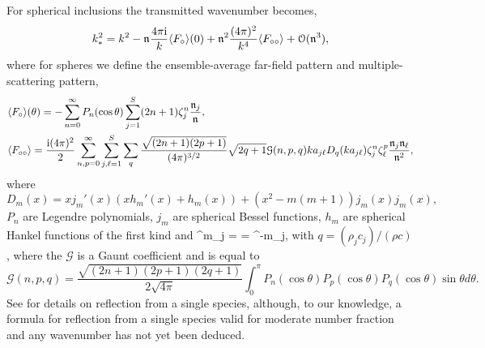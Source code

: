 \documentclass[12pt, a4paper]{article}
\begin{document}
For spherical inclusions the transmitted wavenumber becomes,
\begin{align}
   k_*^2 = k^2 -\mathfrak n_{} \frac{4 \pi \textrm{i}}{k}  \langle F_\circ \rangle(0) + \mathfrak n_{}^2 \frac{(4 \pi)^2 }{k^4} \langle F_{\circ\circ} \rangle
   + \mathcal O(\mathfrak n_{}^3),
  \label{eqn:SmallNfracSpheres}
\end{align}
where for spheres we define the ensemble-average far-field pattern and multiple-scattering pattern,
\begin{align}
  &\langle F_\circ \rangle(\theta) = - \sum_{n=0}^\infty P_n (\cos \theta ) \sum_{j=1}^S (2n+1)  \zeta^n_j \frac{\mathfrak n_{j}}{\mathfrak n_{}},
\\
  &\langle F_{\circ\circ} \rangle = \frac{\textrm{i} (4 \pi)^2}{2} \sum_{n,p=0}^\infty \sum_{j,\ell=1}^S \sum_q  \frac{\sqrt{(2n+1)(2p+1)}}{(4 \pi)^{3/2}}  \sqrt{2 q +1} \mathcal G(n,p,q) k a_{j\ell} D_q(k a_{j\ell}) \zeta^n_j \zeta^p_\ell \frac{\mathfrak n_{j} \mathfrak n_{\ell}}{\mathfrak n_{}^2},
\notag
\end{align}
where
\[
D_m(x) = x j_m'(x)( x h_m'(x) + h_m(x)) + (x^2 - m(m+1))j_m(x) j_m(x),
\]
$P_n$ are   Legendre polynomials, $j_m$ are   spherical Bessel functions, $h_m$ are spherical Hankel functions of the first kind  and
\be
\scatZs^m_j =  = \scatZs^{-m}_j,
\label{eqn:Zm}
\en
with $q = (\rho_j c_j)/(\rho c)$, where the $\mathcal G$ is a Gaunt coefficient and is equal to
\[
\mathcal G(n,p,q) = \frac{\sqrt{(2n+1)(2p+1)(2q+1)}}{2 \sqrt{4 \pi}}   \int_0^\pi  P_n(\cos \theta) P_p(\cos \theta) P_q(\cos \theta) \sin \theta d \theta.
\]
See \cite{caleap_effective_2012} for details on reflection from a single species, although, to our knowledge, a formula for reflection from a single species valid for moderate number fraction and any wavenumber has not yet been deduced.

\printbibliography

% 
% 
\end{document}
